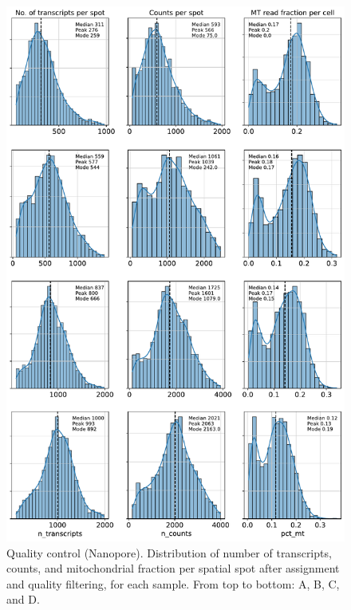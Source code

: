 \documentclass[utf8]{frontiers_suppmat} %
\begin{document}
\begin{figure}[htbp]
\begin{center}
\includegraphics[width=.75\textwidth]{figS2}%
\end{center}
\caption{Quality control (Nanopore). Distribution of number of transcripts, counts, and mitochondrial fraction per spatial spot after assignment and quality filtering, for each sample. From top to bottom: A, B, C, and D.}\label{fig:S2}
\end{figure}
\end{document}

